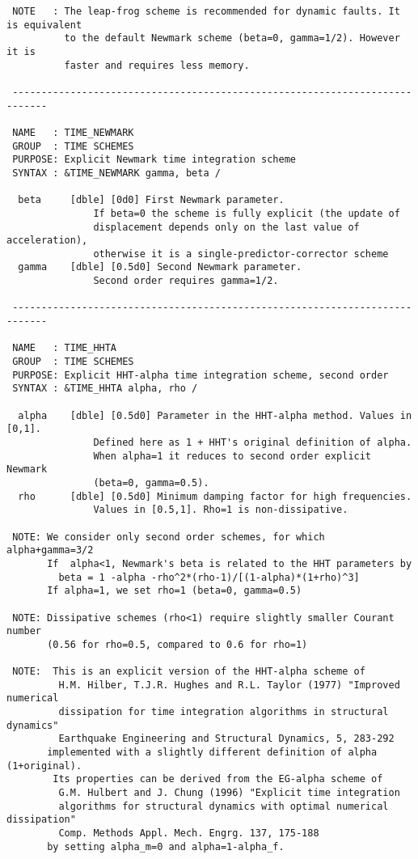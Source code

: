 \begin{verbatim}
 NOTE   : The leap-frog scheme is recommended for dynamic faults. It is equivalent 
          to the default Newmark scheme (beta=0, gamma=1/2). However it is 
          faster and requires less memory.

 ----------------------------------------------------------------------------

 NAME   : TIME_NEWMARK
 GROUP  : TIME SCHEMES
 PURPOSE: Explicit Newmark time integration scheme 
 SYNTAX : &TIME_NEWMARK gamma, beta /

  beta     [dble] [0d0] First Newmark parameter.
               If beta=0 the scheme is fully explicit (the update of
               displacement depends only on the last value of acceleration),
               otherwise it is a single-predictor-corrector scheme
  gamma    [dble] [0.5d0] Second Newmark parameter.
               Second order requires gamma=1/2.

 ----------------------------------------------------------------------------

 NAME   : TIME_HHTA
 GROUP  : TIME SCHEMES
 PURPOSE: Explicit HHT-alpha time integration scheme, second order 
 SYNTAX : &TIME_HHTA alpha, rho /

  alpha    [dble] [0.5d0] Parameter in the HHT-alpha method. Values in [0,1].
               Defined here as 1 + HHT's original definition of alpha.
               When alpha=1 it reduces to second order explicit Newmark
               (beta=0, gamma=0.5).
  rho      [dble] [0.5d0] Minimum damping factor for high frequencies.
               Values in [0.5,1]. Rho=1 is non-dissipative.

 NOTE: We consider only second order schemes, for which alpha+gamma=3/2
       If  alpha<1, Newmark's beta is related to the HHT parameters by
         beta = 1 -alpha -rho^2*(rho-1)/[(1-alpha)*(1+rho)^3]
       If alpha=1, we set rho=1 (beta=0, gamma=0.5)
 
 NOTE: Dissipative schemes (rho<1) require slightly smaller Courant number
       (0.56 for rho=0.5, compared to 0.6 for rho=1)

 NOTE:	This is an explicit version of the HHT-alpha scheme of
         H.M. Hilber, T.J.R. Hughes and R.L. Taylor (1977) "Improved numerical 
         dissipation for time integration algorithms in structural dynamics" 
         Earthquake Engineering and Structural Dynamics, 5, 283-292
       implemented with a slightly different definition of alpha (1+original).
      	Its properties can be derived from the EG-alpha scheme of
         G.M. Hulbert and J. Chung (1996) "Explicit time integration 
         algorithms for structural dynamics with optimal numerical dissipation"
         Comp. Methods Appl. Mech. Engrg. 137, 175-188
       by setting alpha_m=0 and alpha=1-alpha_f.

\end{verbatim}
